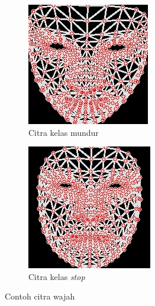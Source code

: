 \begin{figure}[H]
  \begin{subfigure}{0.3\textwidth}
      \centering
      \includegraphics[width=\linewidth]{gambar/normal mundur.jpg}
      \caption{Citra kelas mundur}
      \label{fig:image4}
  \end{subfigure}
  \hfill
  \begin{subfigure}{0.3\textwidth}
      \centering
      \includegraphics[width=\linewidth]{gambar/normal stop.jpg}
      \caption{Citra kelas \emph{stop}}
      \label{fig:image5}
  \end{subfigure}
  \caption{Contoh citra wajah}
  \label{fig:contohcitrawajah}
\end{figure}


